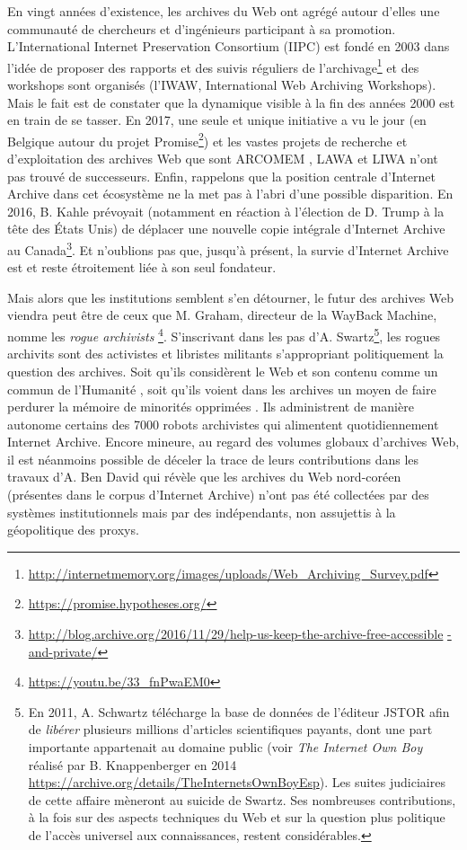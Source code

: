 \documentclass[symmetric,justified,marginals=raggedouter]{tufte-book}
\begin{document}
En vingt années d'existence, les archives du Web ont agrégé autour d'elles une communauté de chercheurs et d'ingénieurs participant à sa promotion. L'International Internet Preservation Consortium (IIPC) est fondé en 2003 dans l'idée de proposer des rapports et des suivis réguliers de l'archivage\footnote{\RaggedOuter \url{http://internetmemory.org/images/uploads/Web\_Archiving\_Survey.pdf}} et des workshops sont organisés (l'IWAW, International Web Archiving Workshops). Mais le fait est de constater que la dynamique visible à la fin des années 2000 est en train de se tasser. En 2017, une seule et unique initiative a vu le jour (en Belgique autour du projet Promise\footnote{\RaggedOuter \url{https://promise.hypotheses.org/}}) et les vastes projets de recherche et d'exploitation des archives Web que sont ARCOMEM \citep{risse_arcomem_2014}, LAWA \citep{spaniol_tracking_2012} et LIWA \citep{denev_sharc:_2009} n'ont pas trouvé de successeurs. Enfin, rappelons que la position centrale d'Internet Archive dans cet écosystème ne la met pas à l'abri d'une possible disparition. En 2016, B. Kahle prévoyait (notamment en réaction à l'élection de D. Trump à la tête des États Unis) de déplacer une nouvelle copie intégrale d'Internet Archive au Canada\footnote{\RaggedOuter \url{http://blog.archive.org/2016/11/29/help-us-keep-the-archive-free-accessible} \url{-and-private/}}. Et n'oublions pas que, jusqu'à présent, la survie d'Internet Archive est et reste étroitement liée à son seul fondateur.  

Mais alors que les institutions semblent s'en détourner, le futur des archives Web viendra peut être de ceux que M. Graham, directeur de la WayBack Machine, nomme les \og \textit{rogue archivists} \fg{}\footnote{\RaggedOuter \url{https://youtu.be/33_fnPwaEM0}}. S'inscrivant dans les pas d'A. Swartz\footnote{\RaggedOuter En 2011, A. Schwartz télécharge la base de données de l'éditeur JSTOR afin de \og \textit{libérer}\fg{} plusieurs millions d'articles scientifiques payants, dont une part importante appartenait au domaine public (voir \textit{The Internet Own Boy} réalisé par B. Knappenberger en 2014 \url{https://archive.org/details/TheInternetsOwnBoyEsp}). Les suites judiciaires de cette affaire mèneront au suicide de Swartz. Ses nombreuses contributions, à la fois sur des aspects techniques du Web et sur la question plus politique de l'accès universel aux connaissances, restent considérables.}, les rogues archivits sont des activistes et libristes militants s'appropriant politiquement la question des archives. Soit qu'ils considèrent le Web et son contenu comme un commun de l'Humanité \citep{coriat_retour_2015}, soit qu'ils voient dans les archives un moyen de faire perdurer la mémoire de minorités opprimées \citep{de_kosnik_rogue_2016}. Ils administrent de manière autonome certains des 7000 robots archivistes qui alimentent quotidiennement Internet Archive. Encore mineure, au regard des volumes globaux d'archives Web, il est néanmoins possible de déceler la trace de leurs contributions dans les travaux d'A. Ben David \citep{ben-david_internet_2018} qui révèle que les archives du Web nord-coréen (présentes dans le corpus d'Internet Archive) n'ont pas été collectées par des systèmes institutionnels mais par des indépendants, non assujettis à la géopolitique des proxys.       
\end{document}
